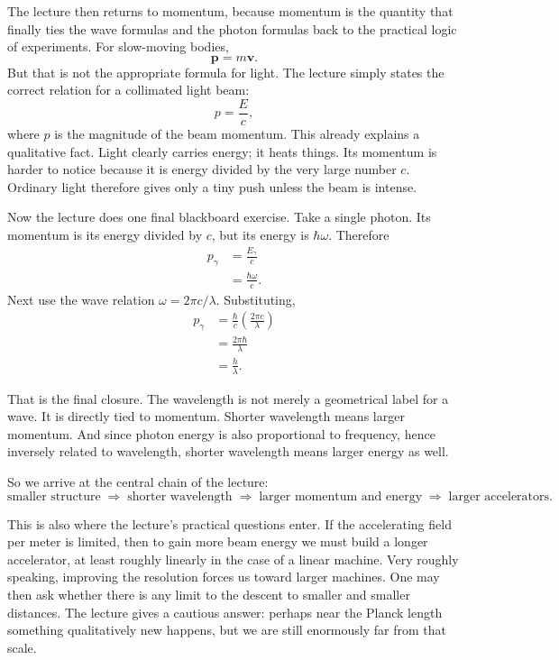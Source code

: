 The lecture then returns to momentum, because momentum is the quantity that finally ties the wave formulas and the photon formulas back to the practical logic of experiments. For slow-moving bodies,
\begin{equation}
\mathbf{p} = m\mathbf{v}.
\end{equation}
But that is not the appropriate formula for light. The lecture simply states the correct relation for a collimated light beam:
\begin{equation}
p = \frac{E}{c},
\end{equation}
where \(p\) is the magnitude of the beam momentum. This already explains a qualitative fact. Light clearly carries energy; it heats things. Its momentum is harder to notice because it is energy divided by the very large number \(c\). Ordinary light therefore gives only a tiny push unless the beam is intense.

Now the lecture does one final blackboard exercise. Take a single photon. Its momentum is its energy divided by \(c\), but its energy is \(\hbar\omega\). Therefore
\begin{align}
p_\gamma &= \frac{E_\gamma}{c} \nonumber\\
&= \frac{\hbar\omega}{c}. \label{eq:photon-momentum-first}
\end{align}
Next use the wave relation \(\omega = 2\pi c/\lambda\). Substituting,
\begin{align}
p_\gamma
&= \frac{\hbar}{c}\left(\frac{2\pi c}{\lambda}\right) \nonumber\\
&= \frac{2\pi\hbar}{\lambda} \nonumber\\
&= \frac{h}{\lambda}. \label{eq:debroglie-photon}
\end{align}

That is the final closure. The wavelength is not merely a geometrical label for a wave. It is directly tied to momentum. Shorter wavelength means larger momentum. And since photon energy is also proportional to frequency, hence inversely related to wavelength, shorter wavelength means larger energy as well.

So we arrive at the central chain of the lecture:
\begin{equation}
\text{smaller structure}
\;\Longrightarrow\;
\text{shorter wavelength}
\;\Longrightarrow\;
\text{larger momentum and energy}
\;\Longrightarrow\;
\text{larger accelerators}.
\end{equation}

This is also where the lecture's practical questions enter. If the accelerating field per meter is limited, then to gain more beam energy we must build a longer accelerator, at least roughly linearly in the case of a linear machine. Very roughly speaking, improving the resolution forces us toward larger machines. One may then ask whether there is any limit to the descent to smaller and smaller distances. The lecture gives a cautious answer: perhaps near the Planck length something qualitatively new happens, but we are still enormously far from that scale.

